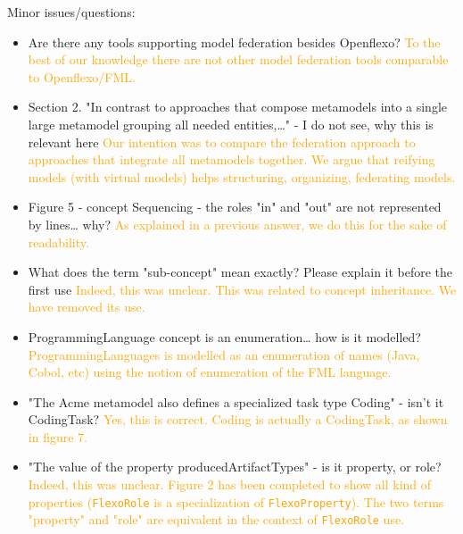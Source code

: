 \documentclass[10pt]{article}
\begin{document}
\begin{response}{Minor issues/questions:
\begin{itemize}
    \item Are there any tools supporting model federation besides Openflexo? \textcolor{orange}{To the best of our knowledge there are not other model federation tools comparable to Openflexo/FML.}
    \item Section 2. "In contrast to approaches that compose metamodels into a single large metamodel grouping all needed entities,…" - I do not see, why this is relevant here \textcolor{orange}{Our intention was to compare the federation approach to approaches that integrate all metamodels together. We argue that reifying models (with virtual models) helps structuring, organizing, federating models.}
    \item Figure 5 - concept Sequencing - the roles "in" and "out" are not represented by lines… why? \textcolor{orange}{As explained in a previous answer, we do this for the sake of readability.}
    \item What does the term "sub-concept" mean exactly? Please explain it before the first use \textcolor{orange}{Indeed, this was unclear. This was related to concept inheritance. We have removed its use.}
    \item ProgrammingLanguage concept is an enumeration… how is it modelled? \textcolor{orange}{ProgrammingLanguages is modelled as an enumeration of names (Java, Cobol, etc) using the notion of enumeration of the FML language. }
    \item "The Acme metamodel also defines a specialized task type Coding" - isn’t it CodingTask? \textcolor{orange}{Yes, this is correct. Coding is actually a CodingTask, as shown in figure 7.}
    \item "The value of the property producedArtifactTypes" - is it property, or role? \textcolor{orange}{Indeed, this was unclear. Figure 2 has been completed to show all kind of properties (\texttt{FlexoRole} is a specialization of \texttt{FlexoProperty}). The two terms "property" and "role" are equivalent in the context of \texttt{FlexoRole} use. }
\end{itemize}}







\end{response}
\end{document}
